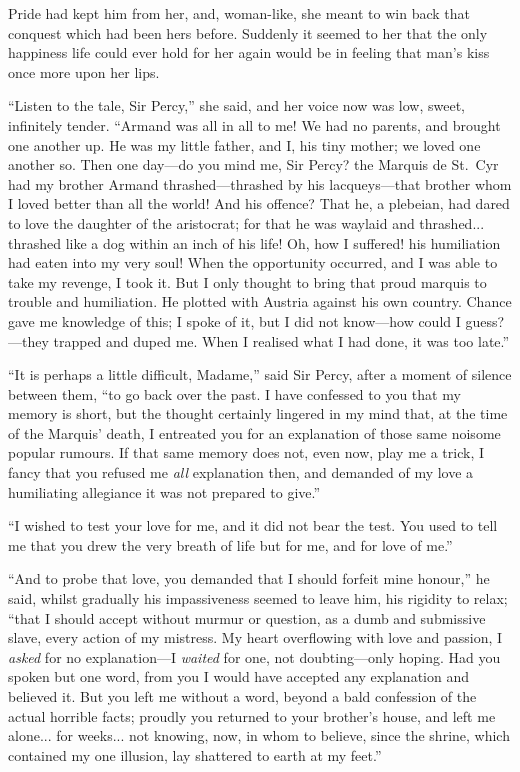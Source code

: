 \documentclass[paper=5.5in:8.5in,BCOR=7mm,twoside,DIV=calc,12pt,usegeometry,chapterprefix,endperiod,headings=big]{scrbook}
\begin{document}
Pride had kept him from her, and, woman-like, she meant to win back that conquest which had been hers before. Suddenly it seemed to her that the only happiness life could ever hold for her again would be in feeling that man's kiss once more upon her lips.

\enquote{Listen to the tale, Sir Percy,} she said, and her voice now was low, sweet, infinitely tender. \enquote{Armand was all in all to me! We had no parents, and brought one another up. He was my little father, and I, his tiny mother; we loved one another so. Then one day---do you mind me, Sir Percy? the Marquis de St.~Cyr had my brother Armand thrashed---thrashed by his lacqueys---that brother whom I loved better than all the world! And his offence? That he, a plebeian, had dared to love the daughter of the aristocrat; for that he was waylaid and thrashed... thrashed like a dog within an inch of his life! Oh, how I suffered! his humiliation had eaten into my very soul! When the opportunity occurred, and I was able to take my revenge, I took it. But I only thought to bring that proud marquis to trouble and humiliation. He plotted with Austria against his own country. Chance gave me knowledge of this; I spoke of it, but I did not know---how could I guess?---they trapped and duped me. When I realised what I had done, it was too late.}

\enquote{It is perhaps a little difficult, Madame,} said Sir Percy, after a moment of silence between them, \enquote{to go back over the past. I have confessed to you that my memory is short, but the thought certainly lingered in my mind that, at the time of the Marquis’ death, I entreated you for an explanation of those same noisome popular rumours. If that same memory does not, even now, play me a trick, I fancy that you refused me \textit{all} explanation then, and demanded of my love a humiliating allegiance it was not prepared to give.}

\enquote{I wished to test your love for me, and it did not bear the test. You used to tell me that you drew the very breath of life but for me, and for love of me.}

\enquote{And to probe that love, you demanded that I should forfeit mine honour,} he said, whilst gradually his impassiveness seemed to leave him, his rigidity to relax; \enquote{that I should accept without murmur or question, as a dumb and submissive slave, every action of my mistress. My heart overflowing with love and passion, I \textit{asked} for no explanation---I \textit{waited} for one, not doubting---only hoping. Had you spoken but one word, from you I would have accepted any explanation and believed it. But you left me without a word, beyond a bald confession of the actual horrible facts; proudly you returned to your brother's house, and left me alone... for weeks... not knowing, now, in whom to believe, since the shrine, which contained my one illusion, lay shattered to earth at my feet.}
\end{document}
